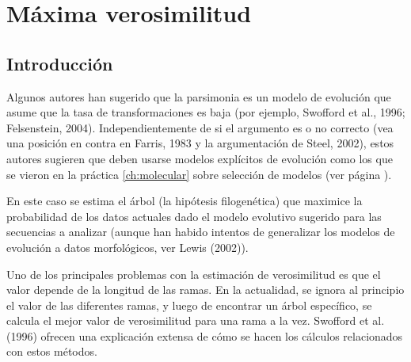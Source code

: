 \chapter{M\'axima verosimilitud}
\section*{Introducci\'on}
\label{ch:likelihood}

Algunos autores han sugerido que la parsimonia es un modelo de evoluci\'on que asume que la tasa de transformaciones es baja (por ejemplo, Swofford et al., 1996; Felsenstein, 2004). Independientemente de si el argumento es o no correcto (vea una posici\'on en contra en Farris, 1983 y la argumentaci\'on de Steel, 2002), estos autores sugieren que deben usarse modelos expl\'icitos de evoluci\'on como los que se vieron en la pr\'actica \ref{ch:molecular} sobre selecci\'on de modelos (ver p\'agina \pageref{ch:molecular}).


En este caso se estima el \'arbol (la hip\'otesis filogen\'etica) que maximice la probabilidad de los datos actuales dado el modelo evolutivo sugerido para las secuencias a analizar (aunque han habido intentos de generalizar los modelos de evoluci\'on a datos morfol\'ogicos, ver  Lewis (2002)).

Uno de los principales problemas con la estimaci\'on de verosimilitud es que el valor depende de la longitud de las ramas. En la actualidad, se ignora al principio el valor de las diferentes ramas, y luego de encontrar un \'arbol espec\'ifico, se calcula el mejor valor de verosimilitud para una rama a la vez. Swofford et al. (1996) ofrecen una explicaci\'on extensa de c\'omo se hacen los c\'alculos relacionados con estos m\'etodos.

